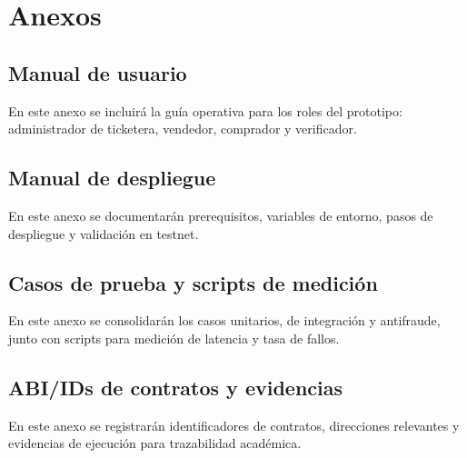 \newpage
\section{Anexos}
\subsection{Manual de usuario}
En este anexo se incluirá la guía operativa para los roles del prototipo: administrador de ticketera, vendedor, comprador y verificador.

\subsection{Manual de despliegue}
En este anexo se documentarán prerequisitos, variables de entorno, pasos de despliegue y validación en testnet.

\subsection{Casos de prueba y scripts de medición}
En este anexo se consolidarán los casos unitarios, de integración y antifraude, junto con scripts para medición de latencia y tasa de fallos.

\subsection{ABI/IDs de contratos y evidencias}
En este anexo se registrarán identificadores de contratos, direcciones relevantes y evidencias de ejecución para trazabilidad académica.
